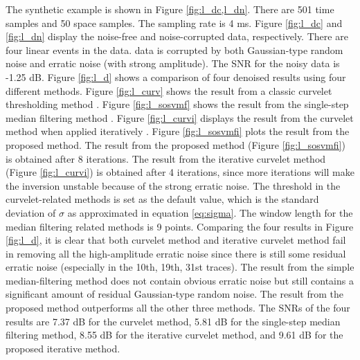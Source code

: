 The synthetic example is shown in Figure \ref{fig:l_dc,l_dn}. There are 501 time samples and 50 space samples. The sampling rate is 4 ms. Figure \ref{fig:l_dc} and \ref{fig:l_dn} display the noise-free and noise-corrupted data, respectively. There are four linear events in the data.  data is corrupted by both Gaussian-type random noise and erratic noise (with strong amplitude). The SNR for the noisy data is -1.25 dB. Figure \ref{fig:l_d} shows a comparison of four denoised results using four different methods. Figure \ref{fig:l_curv} shows the result from a classic curvelet thresholding method . Figure \ref{fig:l_sosvmf} shows the result from the single-step median filtering method . Figure \ref{fig:l_curvi} displays the result from the curvelet method when applied iteratively . Figure \ref{fig:l_sosvmfi} plots the result from the proposed method. The result from the proposed method (Figure \ref{fig:l_sosvmfi}) is obtained after 8 iterations. The result from the iterative curvelet method (Figure \ref{fig:l_curvi}) is obtained after 4 iterations, since more iterations will make the inversion unstable because of the strong erratic noise. The threshold in the curvelet-related methods  is set as the default value, which is the standard deviation of $\sigma$ as approximated in equation \ref{eq:sigma}. The window length for the median filtering related methods is 9 points. Comparing the four results in Figure \ref{fig:l_d}, it is clear that both curvelet method and iterative curvelet method fail in removing all the high-amplitude erratic noise since there is still some residual erratic noise (especially in the 10th, 19th, 31st traces). The result from the simple median-filtering method does not contain obvious erratic noise but still contains a significant amount of residual Gaussian-type random noise. The result from the proposed method outperforms all the other three methods. The SNRs of the four results are 7.37 dB for the curvelet method, 5.81 dB for the single-step median filtering method, 8.55 dB for the iterative curvelet method, and 9.61 dB for the proposed iterative method. 
